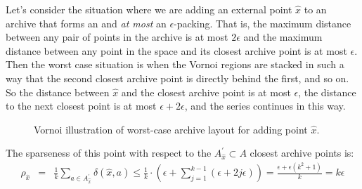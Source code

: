 \documentclass[twoside]{article}
\begin{document}
Let's consider the situation where we are adding an external point $\hat{x}$ to an archive that forms an  and \emph{at most} an $\epsilon$-packing.  That is, the maximum distance between any pair of points in the archive is at most $2\epsilon$ and the maximum distance between any point in the space and its closest archive point is at most $\epsilon$.  Then the worst case situation is when the Vornoi regions are stacked in such a way that the second closest archive point is directly behind the first, and so on.  So the distance between $\hat{x}$ and the closest archive point is at most $\epsilon$, the distance to the next closest point is at most $\epsilon + 2\epsilon$, and the series continues in this way.
%
\begin{figure}[h]
  \center{}
  \caption{\label{fig:vornoi} Vornoi illustration of worst-case archive layout for adding point $\hat{x}$.}
\end{figure}

The sparseness of this point with respect to the $A^\prime_{\hat{x}} \subset A$ closest archive points is:
\begin{eqnarray*}
  \rho_{\hat{x}} & = & \frac{1}{k} \sum_{a \in A^\prime_{\hat{x}}} \delta(\hat{x},a) 
                 \leq  \frac{1}{k} \cdot\left( \epsilon + \sum_{j=1}^{k-1} \left( \epsilon + 2j\epsilon \right) \right) %
                 = \frac{\epsilon + \epsilon\left(k^2 +1\right)}{k} 
                 = k\epsilon
\end{eqnarray*}
\end{document}
